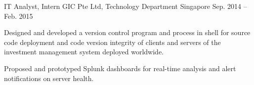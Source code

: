 \begin{cventries}
{\begin{cvitems}
      \end{cvitems}
    }
  \cventry
    {IT Analyst, Intern}
    {GIC Pte Ltd, Technology Department}
    {Singapore}
    {Sep. 2014 – Feb. 2015}
    {
      \begin{cvitems}
        \item {Designed and developed a version control program and process in shell for source code deployment and code version integrity of clients and servers of the investment management system deployed worldwide.}
        \item {Proposed and prototyped Splunk dashboards for real-time analysis and alert notifications on server health.}
      \end{cvitems} 
    }
\end{cventries}
